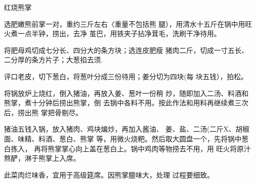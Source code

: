 \begin{recipe}{红烧熊掌}

\ingredients


\cooking

\step 选肥嫩熊前掌一对，重约三斤左右〈重量不包括熊 腿），用清水十五斤在锅中用旺火煮一点半钟，捞出，去净 茧巴，用铁夹子拈净茸毛，洗刷干净待用。

\step 将肥母鸡切成七分长、四分大的条方块；选连皮肥瘦 猪肉二斤，切成一寸五长、二分厚的条方片子；大葱掐去须.

评口老皮，切下葱白，将葱叶分成三份待用；姜分切为四块(每 块五钱），拍松。

\step 将锅放炉上烧红，倒入猪油，再放入姜、葱叶一份稍 炒，随即加入二汤、料酒和熊掌，煮十分钟后捞出熊掌，倒 去锅中各料不用。按此作法和用料再继续煮三次后，捞出熊 掌把骨剔尽。

\step 猪油五钱入锅，放入猪肉、鸡块煸炒，再加入酱油、 姜、盐、二汤(二斤X、胡椒面、味精、料酒、葱白、熊掌 等，用微火烧粑。然后取大圆盘一个，先将锅中葱白拣入， 再将熊掌掌心向上盖在葱白上。锅中鸡肉等物捞去不用，用 旺火将原汁熬酽，淋于熊掌上入席。

\notes

此菜肉烂味香，宜用于高级筵席。因熊掌膻味大，处理 过程要细致。

\end{recipe}

